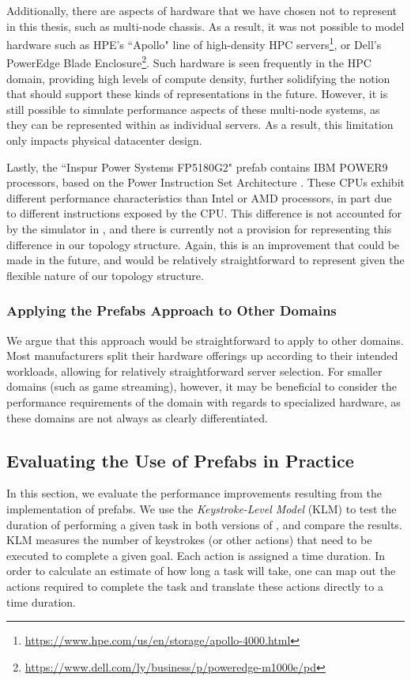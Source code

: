 \documentclass[11pt]{article}
\begin{document}
			Additionally, there are aspects of hardware that we have chosen not to represent in this thesis, such as multi-node chassis.
			As a result, it was not possible to model hardware such as HPE's ``Apollo" line of high-density HPC servers\footnote{\url{https://www.hpe.com/us/en/storage/apollo-4000.html}}, or Dell's PowerEdge Blade Enclosure\footnote{\url{https://www.dell.com/ly/business/p/poweredge-m1000e/pd}}.
			Such hardware is seen frequently in the HPC domain, providing high levels of compute density, further solidifying the notion that \opendc{} should support these kinds of representations in the future.
			However, it is still possible to simulate performance aspects of these multi-node systems, as they can be represented within \opendc{} as individual servers.
			As a result, this limitation only impacts physical datacenter design.

			Lastly, the ``Inspur Power Systems FP5180G2" prefab contains IBM POWER9 processors, based on the Power Instruction Set Architecture \cite{IBM2017}.
			These CPUs exhibit different performance characteristics than Intel or AMD processors, in part due to different instructions exposed by the CPU.
			This difference is not accounted for by the simulator in \opendc{}, and there is currently not a provision for representing this difference in our topology structure.
			Again, this is an improvement that could be made in the future, and would be relatively straightforward to represent given the flexible nature of our topology structure.


		\subsubsection{Applying the Prefabs Approach to Other Domains}
			We argue that this approach would be straightforward to apply to other domains.
			Most manufacturers split their hardware offerings up according to their intended workloads, allowing for relatively straightforward server selection.
			For smaller domains (such as game streaming), however, it may be beneficial to consider the performance requirements of the domain with regards to specialized hardware, as these domains are not always as clearly differentiated.

	\subsection{Evaluating the Use of Prefabs in Practice}
		In this section, we evaluate the performance improvements resulting from the implementation of prefabs.
		We use the \textit{Keystroke-Level Model} (KLM) \cite{Newell1980} to test the duration of performing a given task in both versions of \opendc{}, and compare the results.
		KLM measures the number of keystrokes (or other actions) that need to be executed to complete a given goal. 
		Each action is assigned a time duration.
		In order to calculate an estimate of how long a task will take, one can map out the actions required to complete the task and translate these actions directly to a time duration.
\end{document}
